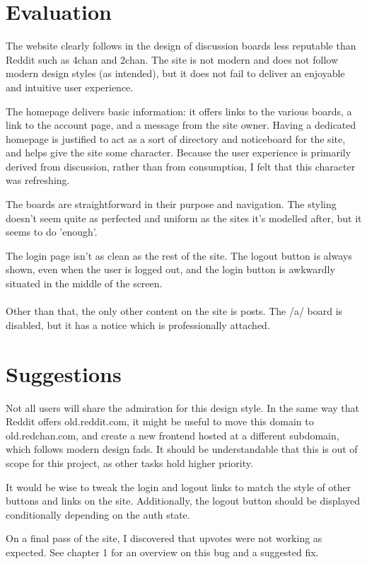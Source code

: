 \section{Evaluation}
The website clearly follows in the design of discussion boards less reputable than Reddit such as 4chan and 2chan. The site is not modern and does not follow modern design styles (as intended), but it does not fail to deliver an enjoyable and intuitive user experience.

The homepage delivers basic information: it offers links to the various boards, a link to the account page, and a message from the site owner. Having a dedicated homepage is justified to act as a sort of directory and noticeboard for the site, and helps give the site some character. Because the user experience is primarily derived from discussion, rather than from consumption, I felt that this character was refreshing.

The boards are straightforward in their purpose and navigation. The styling doesn't seem quite as perfected and uniform as the sites it's modelled after, but it seems to do 'enough'.

The login page isn't as clean as the rest of the site. The logout button is always shown, even when the user is logged out, and the login button is awkwardly situated in the middle of the screen.
\\\\
Other than that, the only other content on the site is posts. The /a/ board is disabled, but it has a notice which is professionally attached.

\section{Suggestions}
Not all users will share the admiration for this design style. In the same way that Reddit offers old.reddit.com, it might be useful to move this domain to old.redchan.com, and create a new frontend hosted at a different subdomain, which follows modern design fads. It should be understandable that this is out of scope for this project, as other tasks hold higher priority.

It would be wise to tweak the login and logout links to match the style of other buttons and links on the site. Additionally, the logout button should be displayed conditionally depending on the auth state.

On a final pass of the site, I discovered that upvotes were not working as expected. See chapter 1 for an overview on this bug and a suggested fix.
